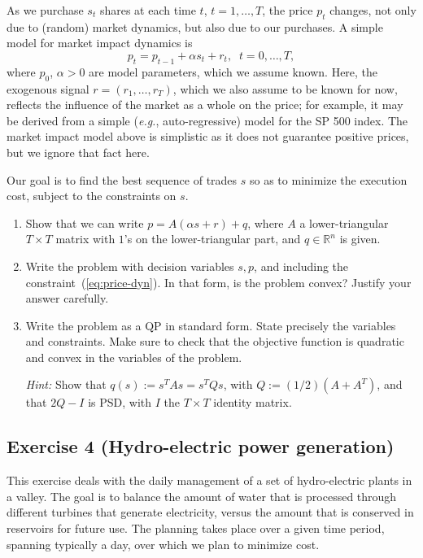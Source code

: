\documentclass[11pt]{article}
\begin{document}
As we purchase $s_t$ shares at each time $t$, $t=1,\ldots,T$, the price $p_t$ changes, not only due to (random) market dynamics, but also due to our purchases. A simple model for market impact dynamics is
\begin{equation}\label{eq:price-dyn}
p_t = p_{t-1} + \alpha s_t + r_t, \;\; t=0,\ldots,T,
\end{equation}
where $p_0$, $\alpha>0$ are model parameters, which we assume known. Here, the exogenous signal $r = (r_1,\ldots,r_T)$, which we also assume to be known for now, reflects the influence of the market as a whole on the price; for example, it may be derived from a simple ({\em e.\/g.}, auto-regressive) model for the SP 500 index. The market impact model above is simplistic as it does not guarantee positive prices, but we ignore that fact here.

Our goal is to find the best sequence of trades $s$ so as to minimize the execution cost, subject to the constraints on $s$.
\begin{enumerate}
\item Show that we can write $p = A(\alpha s+r)+q$, where $A$ a lower-triangular $T \times T$ matrix with $1$'s on the lower-triangular part, and $q\in \mathbb{R}^{n}$ is given.

\item Write the problem with decision variables $s,p$, and including the constraint~(\ref{eq:price-dyn}). In that form, is the problem convex? Justify your answer carefully.

\item Write the problem as a QP in standard form. State precisely the variables and constraints.  Make sure to check that the objective function is quadratic and convex in the variables of the problem.

{\em Hint:} Show that $q(s) := s^T As = s^TQs$, with $Q := (1/2) (A+A^T)$, and that $2Q-I$ is PSD, with $I$ the $T \times T$ identity matrix.
\end{enumerate}

\begin{solution}
\end{solution}

\newpage
\subsection*{Exercise 4 (Hydro-electric power generation)}

This exercise deals with the daily management of a set of hydro-electric plants in a valley. The goal is to balance the amount of water that is processed through different turbines that generate electricity, versus the amount that is conserved in reservoirs for future use. The planning takes place over a given time period, spanning typically a day, over which we plan to minimize cost.
\end{document}
